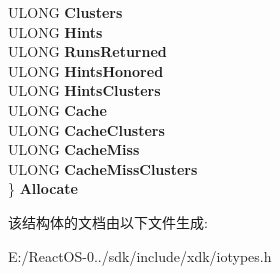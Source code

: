 \begin{DoxyCompactItemize}
\begin{tabbing}
\>ULONG {\bfseries Clusters}\\
\>ULONG {\bfseries Hints}\\
\>ULONG {\bfseries RunsReturned}\\
\>ULONG {\bfseries HintsHonored}\\
\>ULONG {\bfseries HintsClusters}\\
\>ULONG {\bfseries Cache}\\
\>ULONG {\bfseries CacheClusters}\\
\>ULONG {\bfseries CacheMiss}\\
\>ULONG {\bfseries CacheMissClusters}\\
\} {\bfseries Allocate}\\

\end{tabbing}\end{DoxyCompactItemize}


该结构体的文档由以下文件生成\+:\begin{DoxyCompactItemize}
\item 
E\+:/\+React\+O\+S-\/0../sdk/include/xdk/iotypes.\+h\end{DoxyCompactItemize}
